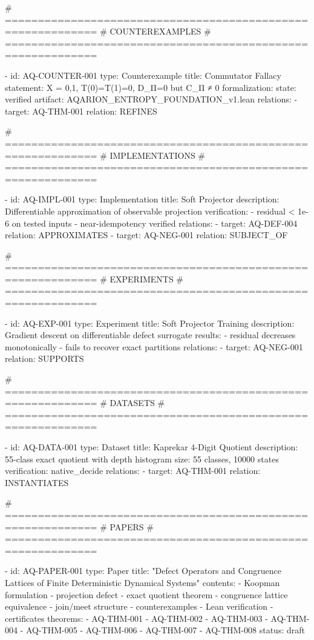   # ============================================================
  # COUNTEREXAMPLES
  # ============================================================

  - id: AQ-COUNTER-001
    type: Counterexample
    title: Commutator Fallacy
    statement: X = {0,1}, T(0)=T(1)=0, D_Π=0 but C_Π ≠ 0
    formalization:
      state: verified
      artifact: AQARION_ENTROPY_FOUNDATION_v1.lean
    relations:
      - target: AQ-THM-001
        relation: REFINES

  # ============================================================
  # IMPLEMENTATIONS
  # ============================================================

  - id: AQ-IMPL-001
    type: Implementation
    title: Soft Projector
    description: Differentiable approximation of observable projection
    verification:
      - residual < 1e-6 on tested inputs
      - near-idempotency verified
    relations:
      - target: AQ-DEF-004
        relation: APPROXIMATES
      - target: AQ-NEG-001
        relation: SUBJECT_OF

  # ============================================================
  # EXPERIMENTS
  # ============================================================

  - id: AQ-EXP-001
    type: Experiment
    title: Soft Projector Training
    description: Gradient descent on differentiable defect surrogate
    results:
      - residual decreases monotonically
      - fails to recover exact partitions
    relations:
      - target: AQ-NEG-001
        relation: SUPPORTS

  # ============================================================
  # DATASETS
  # ============================================================

  - id: AQ-DATA-001
    type: Dataset
    title: Kaprekar 4-Digit Quotient
    description: 55-class exact quotient with depth histogram
    size: 55 classes, 10000 states
    verification: native_decide
    relations:
      - target: AQ-THM-001
        relation: INSTANTIATES

  # ============================================================
  # PAPERS
  # ============================================================

  - id: AQ-PAPER-001
    type: Paper
    title: "Defect Operators and Congruence Lattices of Finite Deterministic Dynamical Systems"
    contents:
      - Koopman formulation
      - projection defect
      - exact quotient theorem
      - congruence lattice equivalence
      - join/meet structure
      - counterexamples
      - Lean verification
      - certificates
    theorems:
      - AQ-THM-001
      - AQ-THM-002
      - AQ-THM-003
      - AQ-THM-004
      - AQ-THM-005
      - AQ-THM-006
      - AQ-THM-007
      - AQ-THM-008
    status: draft

